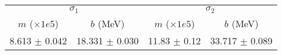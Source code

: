 \begin{tabular}{cc|cc}
\multicolumn{2}{c|}{$\sigma_1$} & \multicolumn{2}{|c}{$\sigma_2$} \\
$m$ ($\times1e5$) & $b$ (MeV) & $m$ ($\times1e5$) & $b$ (MeV) \\
\hline
8.613 $\pm$ 0.042 & 18.331 $\pm$ 0.030 & 11.83 $\pm$ 0.12 & 33.717 $\pm$ 0.089\\
\end{tabular}
